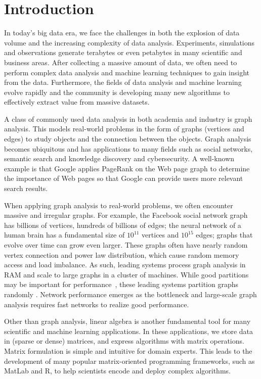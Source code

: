 \chapter{Introduction}
\label{sec:intro}

In today's big data era, we face the challenges in both the explosion of
data volume and the increasing complexity of data analysis. Experiments,
simulations and observations generate terabytes or
even petabytes in many scientific and business areas. After collecting
a massive amount of data, we often need to perform complex data analysis
and machine learning techniques to gain insight from the data. Furthermore,
the fields of data analysis and machine learning evolve rapidly and the community
is developing many new algorithms to effectively extract value from massive
datasets.

A class of commonly used data analysis in both academia and industry is graph
analysis. This models
real-world problems in the form of graphs (vertices and edges) to study objects
and the connection between the objects. Graph analysis becomes ubiquitous
and has applications to many fields such as social networks, semantic search
and knowledge discovery and cybersecurity. A well-known example is that Google
applies PageRank \cite{pagerank} on the Web page graph to determine the importance
of Web pages so that Google can provide users more relevant search results.

When applying graph analysis to real-world problems, we often encounter
massive and irregular graphs. For example, the Facebook social network graph
has billions of vertices, hundreds of billions of edges; the neural network
of a human brain has a fundamental size of $10^{11}$ vertices and $10^{15}$ edges;
graphs that evolve over time can grow even larger. These graphs often have
nearly random vertex connection and power law distribution, which cause random
memory access and load imbalance. As such, leading systems process graph analysis
in RAM and scale to large graphs in a cluster of machines. While good partitions
may be important for performance~\cite{surfer}, these leading systems partition
graphs randomly \cite{powergraph}. Network performance emerges as the bottleneck
and large-scale graph analysis requires fast networks to realize good performance.

Other than graph analysis, linear algebra is another fundamental tool for many
scientific and machine learning applications. In these applications, we store
data in (sparse or dense) matrices, and express algorithms with matrix
operations. Matrix formulation is simple and intuitive for domain experts.
This leads to the development of many popular matrix-oriented programming
frameworks, such as MatLab and R, to help scientists encode and deploy complex
algorithms.

